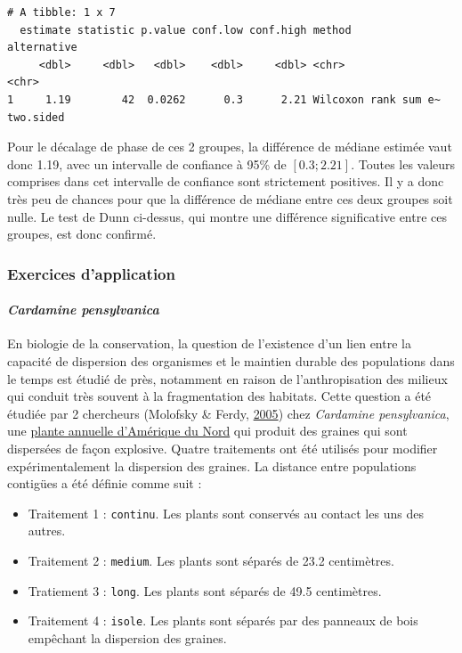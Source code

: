 \documentclass[
  a4paper,
]{article}
\providecommand{\tightlist}{%
  \setlength{\itemsep}{0pt}\setlength{\parskip}{0pt}}
\begin{document}
\begin{verbatim}
# A tibble: 1 x 7
  estimate statistic p.value conf.low conf.high method               alternative
     <dbl>     <dbl>   <dbl>    <dbl>     <dbl> <chr>                <chr>      
1     1.19        42  0.0262      0.3      2.21 Wilcoxon rank sum e~ two.sided  
\end{verbatim}

Pour le décalage de phase de ces 2 groupes, la différence de médiane estimée vaut donc 1.19, avec un intervalle de confiance à 95\% de \([0.3 ; 2.21]\). Toutes les valeurs comprises dans cet intervalle de confiance sont strictement positives. Il y a donc très peu de chances pour que la différence de médiane entre ces deux groupes soit nulle. Le test de Dunn ci-dessus, qui montre une différence significative entre ces groupes, est donc confirmé.

\hypertarget{exercices-dapplication}{%
\subsubsection{Exercices d'application}\label{exercices-dapplication}}

\hypertarget{cardamine-pensylvanica}{%
\paragraph{\texorpdfstring{\emph{Cardamine pensylvanica}}{Cardamine pensylvanica}}\label{cardamine-pensylvanica}}

En biologie de la conservation, la question de l'existence d'un lien entre la capacité de dispersion des organismes et le maintien durable des populations dans le temps est étudié de près, notamment en raison de l'anthropisation des milieux qui conduit très souvent à la fragmentation des habitats. Cette question a été étudiée par 2 chercheurs (Molofsky \& Ferdy, \protect\hyperlink{ref-Molofsky2005}{2005}) chez \emph{Cardamine pensylvanica}, une \href{https://en.wikipedia.org/wiki/Cardamine_pensylvanica}{plante annuelle d'Amérique du Nord} qui produit des graines qui sont dispersées de façon explosive. Quatre traitements ont été utilisés pour modifier expérimentalement la dispersion des graines. La distance entre populations contigües a été définie comme suit :

\begin{itemize}
\tightlist
\item
  Traitement 1 : \texttt{continu}. Les plants sont conservés au contact les uns des autres.
\item
  Traitement 2 : \texttt{medium}. Les plants sont séparés de 23.2 centimètres.
\item
  Tratiement 3 : \texttt{long}. Les plants sont séparés de 49.5 centimètres.
\item
  Traitement 4 : \texttt{isole}. Les plants sont séparés par des panneaux de bois empêchant la dispersion des graines.
\end{itemize}
\end{document}
